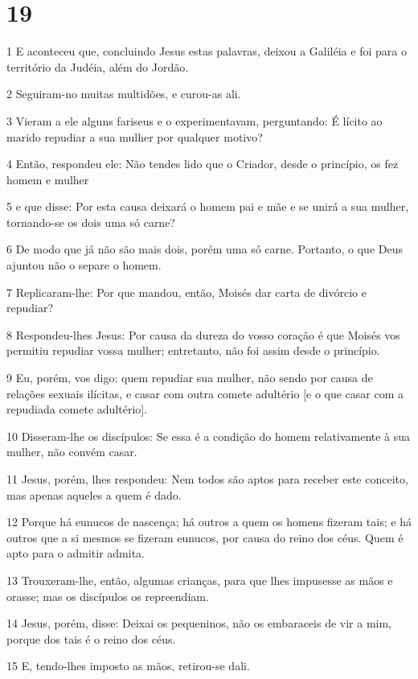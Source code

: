 \chapter{19}

\par 1 E aconteceu que, concluindo Jesus estas palavras, deixou a Galiléia e foi para o território da Judéia, além do Jordão.
\par 2 Seguiram-no muitas multidões, e curou-as ali.
\par 3 Vieram a ele alguns fariseus e o experimentavam, perguntando: É lícito ao marido repudiar a sua mulher por qualquer motivo?
\par 4 Então, respondeu ele: Não tendes lido que o Criador, desde o princípio, os fez homem e mulher
\par 5 e que disse: Por esta causa deixará o homem pai e mãe e se unirá a sua mulher, tornando-se os dois uma só carne?
\par 6 De modo que já não são mais dois, porém uma só carne. Portanto, o que Deus ajuntou não o separe o homem.
\par 7 Replicaram-lhe: Por que mandou, então, Moisés dar carta de divórcio e repudiar?
\par 8 Respondeu-lhes Jesus: Por causa da dureza do vosso coração é que Moisés vos permitiu repudiar vossa mulher; entretanto, não foi assim desde o princípio.
\par 9 Eu, porém, vos digo: quem repudiar sua mulher, não sendo por causa de relações sexuais ilícitas, e casar com outra comete adultério [e o que casar com a repudiada comete adultério].
\par 10 Disseram-lhe os discípulos: Se essa é a condição do homem relativamente à sua mulher, não convém casar.
\par 11 Jesus, porém, lhes respondeu: Nem todos são aptos para receber este conceito, mas apenas aqueles a quem é dado.
\par 12 Porque há eunucos de nascença; há outros a quem os homens fizeram tais; e há outros que a si mesmos se fizeram eunucos, por causa do reino dos céus. Quem é apto para o admitir admita.
\par 13 Trouxeram-lhe, então, algumas crianças, para que lhes impusesse as mãos e orasse; mas os discípulos os repreendiam.
\par 14 Jesus, porém, disse: Deixai os pequeninos, não os embaraceis de vir a mim, porque dos tais é o reino dos céus.
\par 15 E, tendo-lhes imposto as mãos, retirou-se dali.
